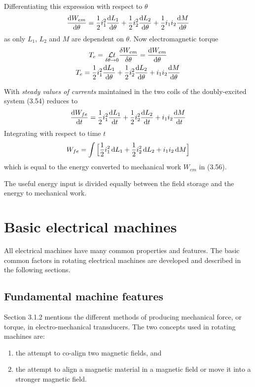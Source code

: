 \documentclass[a4paper,numbers=noenddot,12pt]{scrbook}
\begin{document}
Differentiating this expression with respect to $\theta$
\begin{equation*}
    \dfrac{\dif W_{em}}{\dif \theta} = \dfrac{1}{2} i_1^2 \dfrac{\dif L_1}{\dif \theta} + \dfrac{1}{2} i_2^2 \dfrac{\dif L_2}{\dif \theta} + \dfrac{1}{2} i_1 i_2 \dfrac{\dif M}{\dif \theta}
\end{equation*}
as only $L_1$, $L_2$ and $M$ are dependent on $\theta$. Now electromagnetic torque
\begin{gather}
    T_e = \underset{\delta \theta \to 0}{\mathcal{L} t} \dfrac{\delta W_{em}}{\delta \theta} = \dfrac{\dif W_{em}}{\dif \theta} \nonumber \\
    T_e = \dfrac{1}{2} i_1^2 \dfrac{\dif L_1}{\dif \theta} +\dfrac{1}{2} i_2^2 \dfrac{\dif L_2}{\dif \theta} + i_1 i_2 \dfrac{\dif M}{\dif \theta}
    \label{eq:Eq3.57}
\end{gather}

With \textit{steady values of currents} maintained in the two coils of the doubly-excited system (3.54) reduces to
\begin{equation*}
    \dfrac{\dif W_{fe}}{\dif t} = \dfrac{1}{2} i_1^2 \dfrac{\dif L_1}{\dif t} + \dfrac{1}{2} i_2^2 \dfrac{\dif L_2}{\dif t} + i_1 i_2 \dfrac{\dif M}{\dif t}
\end{equation*}
Integrating with respect to time $t$
\begin{equation}
    W_{fe} = \int \Big[ \dfrac{1}{2} i_1^2 \dif L_1 + \dfrac{1}{2} i_2^2 \dif L_2 + i_1 i_2 \dif M \Big]
    \label{eq:Eq3.58}
\end{equation}
which is equal to the energy converted to mechanical work $W_{em}$ in (3.56).

The useful energy input is divided equally between the field storage and the energy to mechanical work.

\chapter{Basic electrical machines}
All electrical machines have many common properties and features. The basic common factors in rotating electrical machines are developed and described in the following sections. 

\section{Fundamental machine features} 
Section 3.1.2 mentions the different methods of producing mechanical force, or torque, in electro-mechanical transducers. The two concepts used in rotating machines are: 
\begin{enumerate}
    \item the attempt to co-align two magnetic fields, and
    \item the attempt to align a magnetic material in a magnetic field or move it into a stronger magnetic field.
\end{enumerate}
\end{document}
